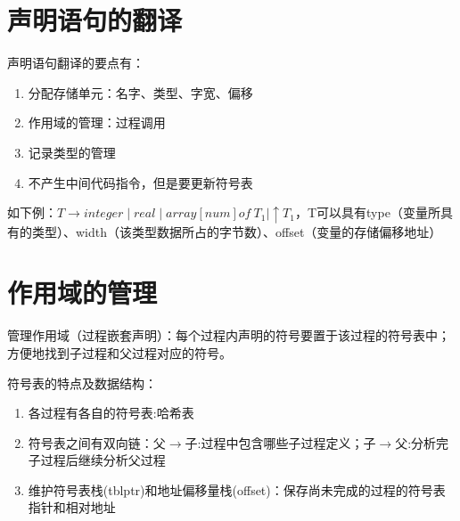 \documentclass[]{report}
\begin{document}
		\section{声明语句的翻译}
			声明语句翻译的要点有：
			\begin{enumerate}
				\item 分配存储单元：名字、类型、字宽、偏移
				\item 作用域的管理：过程调用
				\item 记录类型的管理
				\item 不产生中间代码指令，但是要更新符号表
			\end{enumerate}
			如下例：$T\to integer\mid real\mid array[num]of\ T_1\mid \uparrow T_1$，T可以具有type（变量所具有的类型）、width（该类型数据所占的字节数）、offset（变量的存储偏移地址）
		\section{作用域的管理}
			管理作用域（过程嵌套声明）：每个过程内声明的符号要置于该过程的符号表中；方便地找到子过程和父过程对应的符号。\par
			符号表的特点及数据结构：
			\begin{enumerate}
				\item 各过程有各自的符号表:哈希表
				\item 符号表之间有双向链：父$\to$子:过程中包含哪些子过程定义；子$\to$父:分析完子过程后继续分析父过程
				\item 维护符号表栈(tblptr)和地址偏移量栈(offset)：保存尚未完成的过程的符号表指针和相对地址
			\end{enumerate}
\end{document}
